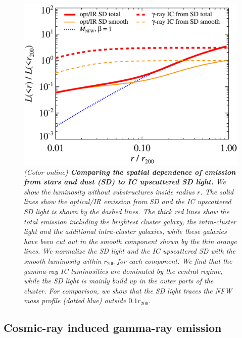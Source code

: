 \documentclass[10pt,aps,pra,reprint,amsmath,amsfonts,amssymb,showpacs,nofootinbib,floatfix]{revtex4-1}
\def\del#1{{}}
\def\C#1{{\bf #1}}
\newcommand{\rvir}{r_{200}}
\begin{document}
\begin{figure}%
 \includegraphics[width=0.99\columnwidth]{figures/lum.stars.bw.eps}
 \caption{\it (Color online) \C{Comparing the spatial dependence of
     emission from stars and dust (SD) to IC upscattered SD light.}
   \del{Accumulative luminosity as a function of radius.}  We show the
   luminosity without substructures inside radius $r$. The solid lines
   show the optical/IR emission from SD and the IC upscattered SD
   light is shown by the dashed lines. The thick red lines show the
   total emission including the brightest cluster galaxy, the
   intra-cluster light and the additional intra-cluster galaxies,
   while these galaxies have been cut out in the smooth component
   shown by the thin orange lines. We normalize the SD light and the
   IC upscattered SD with the smooth luminosity within $\rvir$ for
   each component. We find that the gamma-ray IC luminosities are
   dominated by the central regime, while the SD light is mainly build
   up in the outer parts of the cluster. For comparison, we show that
   the SD light traces the NFW mass profile (dotted blue) outside
   $0.1\rvir$.}
 \label{fig:SD_lum}
\end{figure}


\subsection{Cosmic-ray induced gamma-ray emission}
\label{sect:CRs}
\end{document}
